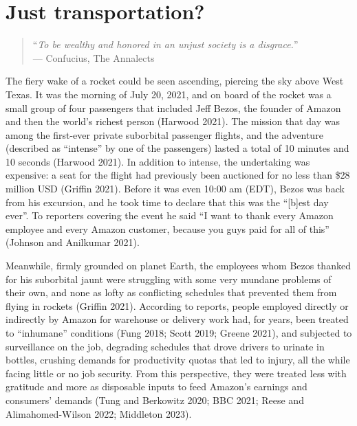 \documentclass[12pt, oneside]{report}
\begin{document}
\newpage

\hypertarget{sect1}{%
\section{Just transportation?}\label{sect1}}

\begin{quote}
``\emph{To be wealthy and honored in an unjust society is a
disgrace.}''\\
--- Confucius, The Annalects
\end{quote}

The fiery wake of a rocket could be seen ascending, piercing the sky
above West Texas. It was the morning of July 20, 2021, and on board of
the rocket was a small group of four passengers that included Jeff
Bezos, the founder of Amazon and then the world's richest person
(Harwood 2021). The mission that day was among the first-ever private
suborbital passenger flights, and the adventure (described as
``intense'' by one of the passengers) lasted a total of 10 minutes and
10 seconds (Harwood 2021). In addition to intense, the undertaking was
expensive: a seat for the flight had previously been auctioned for no
less than \$28 million USD (Griffin 2021). Before it was even 10:00 am
(EDT), Bezos was back from his excursion, and he took time to declare
that this was the ``{[}b{]}est day ever''. To reporters covering the
event he said ``I want to thank every Amazon employee and every Amazon
customer, because you guys paid for all of this'' (Johnson and Anilkumar
2021).

Meanwhile, firmly grounded on planet Earth, the employees whom Bezos
thanked for his suborbital jaunt were struggling with some very mundane
problems of their own, and none as lofty as conflicting schedules that
prevented them from flying in rockets (Griffin 2021). According to
reports, people employed directly or indirectly by Amazon for warehouse
or delivery work had, for years, been treated to ``inhumane'' conditions
(Fung 2018; Scott 2019; Greene 2021), and subjected to surveillance on
the job, degrading schedules that drove drivers to urinate in bottles,
crushing demands for productivity quotas that led to injury, all the
while facing little or no job security. From this perspective, they were
treated less with gratitude and more as disposable inputs to feed
Amazon's earnings and consumers' demands (Tung and Berkowitz 2020; BBC
2021; Reese and Alimahomed-Wilson 2022; Middleton 2023).
\end{document}
